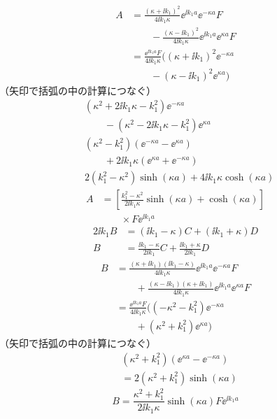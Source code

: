 \begin{align*}
A&=\frac{(\kappa+\ii k_{1})^{2}}{4\ii k_{1}\kappa}\ee^{\ii k_{1}a}\ee^{-\kappa a}F\\
&\qquad-\frac{(\kappa-\ii k_{1})^{2}}{4\ii k_{1}\kappa}\ee^{\ii k_{1}a}\ee^{\kappa a}F\\
&=\frac{\ee^{\ii k_{1}a}F}{4\ii k_{1}\kappa}\bigl((\kappa+\ii k_{1})^{2}\ee^{-\kappa a}\\
&\qquad-(\kappa-\ii k_{1})^{2}\ee^{\kappa a}\bigr)
\end{align*}
（矢印で括弧の中の計算につなぐ）
\begin{align*}
&(\kappa^{2}+2\ii k_{1}\kappa-k_{1}^{2})\ee^{-\kappa a}\\
&\qquad-(\kappa^{2}-2\ii k_{1}\kappa-k_{1}^{2})\ee^{\kappa a}\\
&(\kappa^{2}-k_{1}^{2})(\ee^{-\kappa a}-\ee^{\kappa a})\\
&\qquad+2\ii k_{1}\kappa(\ee^{\kappa a}+\ee^{-\kappa a})\\
&2(k_{1}^{2}-\kappa^{2})\sinh(\kappa a)+4\ii k_{1}\kappa\cosh(\kappa a)
\end{align*}
\begin{align*}
A&=\left[\frac{k_{1}^{2}-\kappa^{2}}{2\ii k_{1}\kappa}\sinh(\kappa a)+\cosh(\kappa a)\right]\\
&\qquad\times F\ee^{\ii k_{1}a}
\end{align*}
\begin{align*}
2\ii k_{1}B&=(\ii k_{1}-\kappa)C+(\ii k_{1}+\kappa)D\\
B&=\frac{\ii k_{1}-\kappa}{2\ii k_{1}}C+\frac{\ii k_{1}+\kappa}{2\ii k_{1}}D
\end{align*}
\begin{align*}
B&=\frac{(\kappa+\ii k_{1})(\ii k_{1}-\kappa)}{4\ii k_{1}\kappa}\ee^{\ii k_{1}a}\ee^{-\kappa a}F\\
&\qquad+\frac{(\kappa-\ii k_{1})(\kappa+\ii k_{1})}{4\ii k_{1}\kappa}\ee^{\ii k_{1}a}\ee^{\kappa a}F\\
&=\frac{\ee^{\ii k_{1}a}F}{4\ii k_{1}\kappa}\bigl((-\kappa^{2}-k_{1}^{2})\ee^{-\kappa a}\\
&\qquad+(\kappa^{2}+k_{1}^{2})\ee^{\kappa a}\bigr)
\end{align*}
（矢印で括弧の中の計算につなぐ）
\begin{align*}
&(\kappa^{2}+k_{1}^{2})(\ee^{\kappa a}-\ee^{-\kappa a})\\
&=2(\kappa^{2}+k_{1}^{2})\sinh(\kappa a)
\end{align*}
\[ B=\frac{\kappa^{2}+k_{1}^{2}}{2\ii k_{1}\kappa}\sinh(\kappa a)F\ee^{\ii k_{1}a} \]
